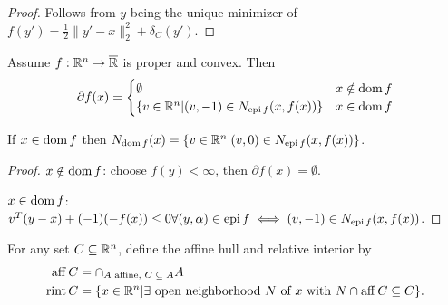 \begin{proof}
  Follows from $y$ being the unique minimizer of $f(y') = \frac{1}{2}
  \| y' - x \|_{2}^{2} + \delta_{C}(y')$.
\end{proof}

\begin{thm}
  \label{sec:subgradients-8}
  Assume $f: \mathbb{R}^{n} \rightarrow \overline {\mathbb{R}}$ is proper and convex.
  Then
  \begin{equation}
    \label{eq:14}
    \partial f(x) =
    \begin{cases}
      \emptyset & x \notin \operatorname*{dom} f \\
      \{ v \in \mathbb{R}^{n} | (v, -1) \in N_{\operatorname*{epi} f}(x, f(x)) \} & x \in
      \operatorname*{dom} f
    \end{cases}
  \end{equation}

  If $x \in \operatorname*{dom} f$ then $N_{\operatorname*{dom} f}(x) = \{ v \in \mathbb{R}^{n} | (v, 0) \in
  N_{\operatorname*{epi} f}(x, f(x)) \} $.
\end{thm}

\begin{proof}
  $x \notin \operatorname*{dom} f$: choose $f(y) < \infty$, then $\partial f(x) =
  \emptyset$.

  $x \in \operatorname*{dom} f$: $v^{T}(y-x) + (-1)(- f(x)) \leq 0 \forall (y,
  \alpha) \in \operatorname*{epi} f \iff (v, -1) \in N_{\operatorname*{epi} f}(x, f(x))$.
\end{proof}

\begin{defn}
  \label{sec:subgradients-10}
  For any set $C \subseteq \mathbb{R}^{n}$, define the affine hull and relative
  interior by
  \begin{align}
    \label{eq:15}
    \operatorname*{aff} C &= \cap_{\text{$A$ affine, $C \subseteq A$}} A \\
    \operatorname*{rint} C &= \{ x \in \mathbb{R}^{n} | \text{$\exists$ open
      neighborhood $N$ of $x$ with $N \cap \operatorname*{aff} C \subseteq C$} \}.
    \label{eq:16}
  \end{align}
\end{defn}

